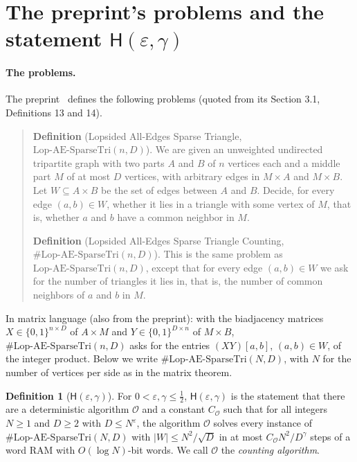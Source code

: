 \documentclass[11pt]{article}
\theoremstyle{definition}
\newtheorem{definition}[theorem]{Definition}
\theoremstyle{remark}
\newcommand{\Lop}{\mathrm{Lop}\text{-}\allowbreak\mathrm{AE}\text{-}\allowbreak\mathrm{SparseTri}}
\newcommand{\Hyp}{\mathsf{H}}
\begin{document}
\section{The preprint's problems and the statement \texorpdfstring{$\Hyp(\varepsilon,\gamma)$}{H(epsilon,gamma)}}\label{c:sec:prelim}

\paragraph{The problems.} The preprint~\cite{ZT} defines the following problems (quoted from its Section 3.1, Definitions 13 and 14).
\begin{quote}
\textbf{Definition} (Lopsided All-Edges Sparse Triangle, $\Lop(n,D)$). We are given an unweighted undirected tripartite graph with two parts $A$ and $B$ of $n$ vertices each and a middle part $M$ of at most $D$ vertices, with arbitrary edges in $M\times A$ and $M\times B$. Let $W\subseteq A\times B$ be the set of edges between $A$ and $B$. Decide, for every edge $(a,b)\in W$, whether it lies in a triangle with some vertex of $M$, that is, whether $a$ and $b$ have a common neighbor in $M$.

{\sloppy\textbf{Definition} (Lopsided All-Edges Sparse Triangle Counting, $\#\Lop(n,D)$). This is the same problem as $\Lop(n,D)$, except that for every edge $(a,b)\in W$ we ask for the number of triangles it lies in, that is, the number of common neighbors of $a$ and $b$ in $M$.\par}
\end{quote}
In matrix language (also from the preprint): with the biadjacency matrices $X\in\{0,1\}^{n\times D}$ of $A\times M$ and $Y\in\{0,1\}^{D\times n}$ of $M\times B$, $\#\Lop(n,D)$ asks for the entries $(XY)[a,b]$, $(a,b)\in W$, of the integer product. Below we write $\#\Lop(N,D)$, with $N$ for the number of vertices per side as in the matrix theorem.

\begin{definition}[$\Hyp(\varepsilon,\gamma)$]\label{c:hyp}
For $0<\varepsilon,\gamma\le\frac12$, $\Hyp(\varepsilon,\gamma)$ is the statement that there are a deterministic algorithm $\mathcal O$ and a constant $C_{\mathcal O}$ such that for all integers $N\ge1$ and $D\ge2$ with $D\le N^\varepsilon$, the algorithm $\mathcal O$ solves every instance of $\#\Lop(N,D)$ with $|W|\le N^2/\sqrt D$ in at most $C_{\mathcal O}N^2/D^\gamma$ steps of a word RAM with $O(\log N)$-bit words. We call $\mathcal O$ the \emph{counting algorithm}.
\end{definition}
\end{document}
